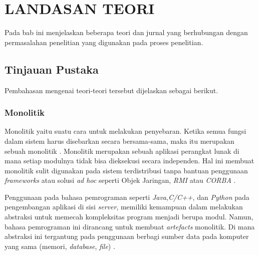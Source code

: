 \chapter{LANDASAN TEORI}
\vspace{4.5pt}
Pada bab ini menjelaskan beberapa teori dan jurnal yang berhubungan dengan permasalahan penelitian yang digunakan pada proses penelitian.
\section{Tinjauan Pustaka}
Pembahasan mengenai teori-teori tersebut dijelaskan sebagai berikut.
\subsection{Monolitik}
Monolitik yaitu suatu cara untuk melakukan penyebaran. Ketika semua fungsi dalam sistem harus disebarkan secara bersama-sama, maka itu merupakan sebuah monolitik \cite{74C}. Monolitik merupakan sebuah aplikasi perangkat lunak di mana setiap modulnya tidak bisa dieksekusi secara independen. Hal ini membuat monolitik sulit digunakan pada sistem terdistribusi tanpa bantuan penggunaan \textit{frameworks} atau solusi \textit{ad hoc} seperti Objek Jaringan, \textit{RMI} atau \textit{CORBA} \cite{0BD}.

Penggunaan pada bahasa pemrograman seperti \textit{Java},\textit{C/C++}, dan \textit{Python} pada pengembangan aplikasi di sisi \textit{server}, memiliki kemampuan dalam melakukan abstraksi untuk memecah kompleksitas program menjadi berupa modul. Namun, bahasa pemrograman ini dirancang untuk membuat \textit{artefacts} monolitik. Di mana abstraksi ini tergantung pada penggunaan berbagi sumber data pada komputer yang sama (memori, \textit{database}, \textit{file}) \cite{0BD}.

